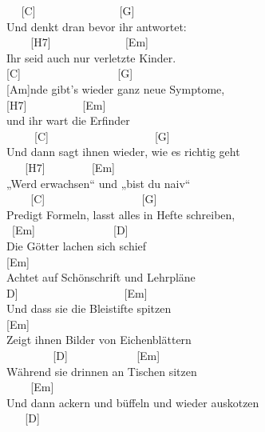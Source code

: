 \documentclass[
  letterpaper,
  twoside=false]{scrbook}
\begin{document}
~ ~{[}C{]} ~ ~ ~ ~ ~ ~ ~ ~ ~{[}G{]}\\
Und denkt dran bevor ihr antwortet:\\
\hspace*{0.333em} ~ ~ ~{[}H7{]} ~ ~ ~ ~ ~ ~ ~ ~{[}Em{]}\\
Ihr seid auch nur verletzte Kinder.\\
\hspace*{0.333em} {[}C{]} ~ ~ ~ ~ ~ ~ ~ ~ ~ ~ {[}G{]}\\
{[}Am{]}nde gibt's wieder ganz neue Symptome,\\
\hspace*{0.333em} {[}H7{]} ~ ~ ~ ~ ~ ~{[}Em{]}\\
und ihr wart die Erfinder\\
\hspace*{0.333em} ~ ~ ~ {[}C{]} ~ ~ ~ ~ ~ ~ ~ ~ ~ ~ ~ {[}G{]}\\
Und dann sagt ihnen wieder, wie es richtig geht\\
\hspace*{0.333em} ~ ~ {[}H7{]} ~ ~ ~ ~ ~{[}Em{]}\\
„Werd erwachsen`` und „bist du naiv``\\
\hspace*{0.333em} ~ ~ ~{[}C{]} ~ ~ ~ ~ ~ ~ ~ ~ ~ ~ {[}G{]}\\
Predigt Formeln, lasst alles in Hefte schreiben,\\
\hspace*{0.333em} ~{[}Em{]} ~ ~ ~ ~ ~ ~ ~ ~ {[}D{]}\\
Die Götter lachen sich schief\\
{[}Em{]}\\
Achtet auf Schönschrift und Lehrpläne\\
\hspace*{0.333em}{[}D{]} ~ ~ ~ ~ ~ ~ ~ ~ ~ ~ ~ {[}Em{]}\\
Und dass sie die Bleistifte spitzen\\
{[}Em{]} ~ ~ ~ ~ ~ ~ ~\\
Zeigt ihnen Bilder von Eichenblättern\\
\hspace*{0.333em} ~ ~ ~ ~ ~ {[}D{]} ~ ~ ~ ~ ~ ~ ~ {[}Em{]}\\
Während sie drinnen an Tischen sitzen\\
\hspace*{0.333em} ~ ~ ~{[}Em{]}\\
Und dann ackern und büffeln und wieder auskotzen\\
\hspace*{0.333em} ~ ~ {[}D{]}\\
\end{document}
